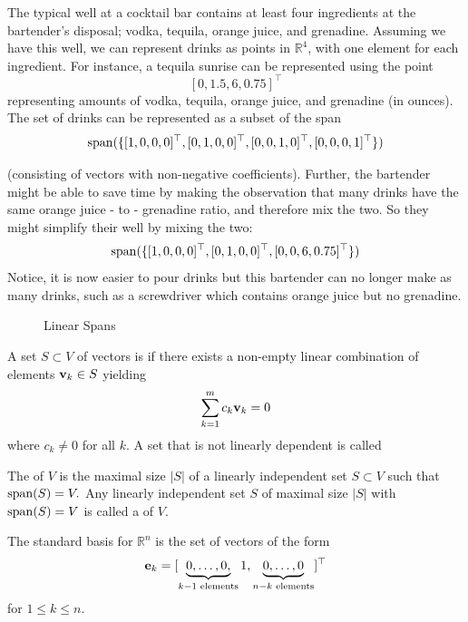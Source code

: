 \begin{example}
The typical well at a cocktail bar contains at least four ingredients at the bartender's disposal; vodka, tequila, orange juice, and grenadine. Assuming we have this well, we can represent drinks as points in $\mathbb R^4$, with one element for each ingredient. For instance, a tequila sunrise can be represented using the point 
$$[0, 1.5, 6, 0.75]^\top$$
representing amounts of vodka, tequila, orange juice, and grenadine (in ounces). The set of drinks can be represented as a subset of the span 
$$\spann(\{ [1,0,0,0]^\top, [0,1,0,0]^\top, [0,0,1,0]^\top,[0,0,0,1]^\top\})$$

(consisting of vectors with non-negative coefficients). Further, the bartender might be able to save time by making the observation that many drinks have the same orange juice - to - grenadine ratio, and therefore mix the two. So they might simplify their well by mixing the two: 
$$\spann(\{[1,0,0,0]^\top, [0,1,0,0]^\top, [0,0,6,0.75]^\top\})$$
Notice, it is now easier to pour drinks but this bartender can no longer make as many drinks, such as a screwdriver which contains orange juice but no grenadine.  
\end{example}

\begin{figure}[H]%
\centering
{}
\hfill
\caption{Linear Spans}
\end{figure}

\begin{definition}
A set $S \subset V$ of vectors is  if there exists a non-empty linear combination of elements $\vv_k \in S$ yielding 
$$\sum_{k = 1}^m c_k \vv_k = 0$$
where $c_k \not = 0$ for all $k$. A set that is not linearly dependent is called 
\end{definition}

\begin{definition}
The  of $V$ is the maximal size $|S|$ of a linearly independent set $S \subset V$ such that $\spann(S) = V.$
Any linearly independent set $S$ of maximal size $|S|$ with $\spann(S) = V$ is called a  of $V$.
\end{definition}

\begin{example}
The standard basis for $\mathbb R^n$ is the set of vectors of the form 
$$\ve_k = [ \underbrace{0, \ldots, 0,}_{k - 1 \text{ elements}} 1, \underbrace{0, \ldots, 0}_{n - k \text{ elements}}]^\top$$
for $1\leq k\leq n$.
\end{example}

